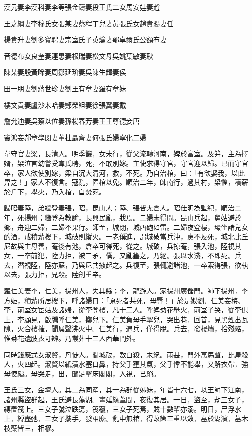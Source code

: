 \begin{pinyinscope}
漢元妻李漢科妻李等張金鑄妻段王氏二女馬安娃妻趙

王之綱妻李穆氏女張某妻蔡程丁兒妻黃張氏女趙貴賜妻任

楊貴升妻劉多寶聘妻宗室氏子英爚妻鄂卓爾氏公額布妻

音德布女良奎妻連惠妻根瑞妻松文母吳姚葉敏妻耿

陳某妻殷黃晞妻周鄒延玠妻吳陳生輝妻侯

田一朋妻劉蔣世珍妻劉王有章妻羅有章妹

樓文貴妻盧沙木哈妻鄭榮組妻徐張翼妻戴

詹允迪妻吳蔡以位妻孫楊春芳妻王王尊德妾唐

竇鴻妾郝章學閔妻董杜聶齊妻何張氏婦寧化二婦

韋守官妻梁，長清人。明季饑，女未行，從父流轉河南，婢於富室。及笄，主為擇婿，梁泣言幼嘗受韋氏聘，死，不敢別嫁。主使求得守官，守官迎以歸。已而守官卒，家人欲使別嫁，梁自沉大清河，救，不死。乃自治棺，曰：「有欲娶我，以此畀之！」家人不復言。寇亂，匿棺以免。順治二年，師南行，過其村，梁懼，積薪於戶下，舉火，乃入棺，自焚死。

歸昭妻陸，弟繼登妻張，昭，昆山人；陸、張皆太倉人。昭仕明為監紀，順治二年，死揚州；繼登為教諭，長興民亂，戕焉。二婦未得問。昆山兵起，舅姑避於鄉，舟迎二婦，二婦不果行。師至，城閉，城西砲如雷。二婦夜登樓，環坐諸兒女酌酒，戒積薪樓下，城破則縱火。一老僕進，謂城破當兵沖，慮不及死，城北比丘尼故與主母善，菴後有池，倉卒可得死，從之。城破，兵掠菴，張入池，陸視其女，一卒前犯，陸力拒，被二矛，僕，又亂箠之，乃絕。張以水淺，不即死。兵去，潛視陸，陸亦蘇，乃與尼共掖起之。兵復至，張輒避諸池，一卒索得張，欲執以去，張力拒，見殺。陸創重卒。

羅仁美妻李，仁美，揚州人，失其縣；李，龍游人。家揚州廣儲門。師下揚州，李方娠，積薪所居樓下，呼諸婦曰：「原死者共死，毋辱！」於是姒劉、仁美妾梅、李，前室女宦姑及諸婦，從李登樓，凡十二人。呼婢菊花舉火，前室子哭，從李俱上，李顧見，啟牖呼仁美，擲兒下。仁美負母手挈兒，哭出巷，回首，見黑煙出瓦隙，火合樓摧，聞屟聲沸火中。仁美行，遇兵，僅得脫。兵去，發樓燼，拾殘骼，惟菊花遺肢衣可辨。乃叢葬十三人西華門外。

同時錢應式女淑賢，丹徒人。聞城破，數自殺，未絕。雨甚，門外萬馬聲，比屋殺人，火四起。淑賢以紙漬水塞口鼻，持父手壅其氣，父手悸不能舉，又解衣帶，強母使縊。母哭走，出，聞足擊床閣閣，入視，已絕。

王氏三女，金壇人。其二為同產，其一為群從姊妹，年皆十六七，以王師下江南，諸州縣盜群起，王氏避長蕩湖。晝延緣葦間，夜復其居。一日，盜至，劫三女子，縛置筏上。三女子號泣跌蕩，筏覆，三女子死焉，賊十數輩亦溺。明日，尸浮水上，縛盡弛，三女子攜手，發相縻。亂中無棺，得故篋三重以斂，墓於湖濱，墓木枝蘗皆三，相樛。


\end{pinyinscope}
